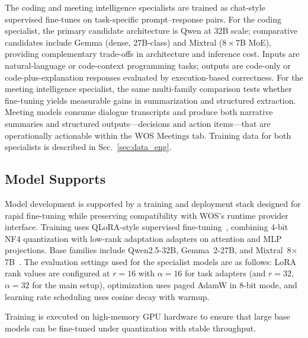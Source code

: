 \documentclass[conference]{IEEEtran}
\begin{document}
The coding and meeting intelligence specialists are trained as chat-style supervised fine-tunes on task-specific prompt--response pairs. For the coding specialist, the primary candidate architecture is Qwen at 32B scale; comparative candidates include Gemma (dense, 27B-class) and Mixtral ($8\times$7B MoE), providing complementary trade-offs in architecture and inference cost. Inputs are natural-language or code-context programming tasks; outputs are code-only or code-plus-explanation responses evaluated by execution-based correctness. For the meeting intelligence specialist, the same multi-family comparison tests whether fine-tuning yields measurable gains in summarization and structured extraction. Meeting models consume dialogue transcripts and produce both narrative summaries and structured outputs---decisions and action items---that are operationally actionable within the WOS Meetings tab. Training data for both specialists is described in Sec.~\ref{sec:data_eng}.
\subsection{Model Supports}
Model development is supported by a training and deployment stack designed for rapid fine-tuning while preserving compatibility with WOS’s runtime provider interface. Training uses QLoRA-style supervised fine-tuning~\cite{dettmers2024qlora,hu2022lora}, combining 4-bit NF4 quantization with low-rank adaptation adapters on attention and MLP projections. Base families include Qwen2.5-32B, Gemma~2-27B, and Mixtral~8$\times$7B~\cite{qwen2025technical,team2024gemma2,jiang2024mixtral}. The evaluation settings used for the specialist models are as follows: LoRA rank values are configured at $r{=}16$ with $\alpha{=}16$ for task adapters (and $r{=}32$, $\alpha{=}32$ for the main setup), optimization uses paged AdamW in 8-bit mode, and learning rate scheduling uses cosine decay with warmup.

Training is executed on high-memory GPU hardware to ensure that large base models can be fine-tuned under quantization with stable throughput.
\end{document}
